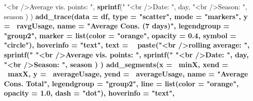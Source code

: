 \documentclass[
  a4paperpaper,
]{book}
\newenvironment{Shaded}{\begin{snugshade}}{\end{snugshade}}
\newcommand{\DataTypeTok}[1]{\textcolor[rgb]{0.13,0.29,0.53}{#1}}
\newcommand{\FloatTok}[1]{\textcolor[rgb]{0.00,0.00,0.81}{#1}}
\newcommand{\KeywordTok}[1]{\textcolor[rgb]{0.13,0.29,0.53}{\textbf{#1}}}
\newcommand{\NormalTok}[1]{#1}
\newcommand{\OperatorTok}[1]{\textcolor[rgb]{0.81,0.36,0.00}{\textbf{#1}}}
\newcommand{\StringTok}[1]{\textcolor[rgb]{0.31,0.60,0.02}{#1}}
\let\oldShaded\Shaded
\let\endoldShaded\endShaded
\renewenvironment{Shaded}{\footnotesize\oldShaded}{\endoldShaded}
\begin{document}
\begin{Shaded}
\begin{Highlighting}[]
{{{{{{{{{{{{{{{{{{{{{{{{{{{{{{{{{{{{{{{                           \StringTok{"<br />Average vis. points: "}\NormalTok{, }\KeywordTok{sprintf}\NormalTok{(}\StringTok{"%
                           \StringTok{"<br />Date:                        "}\NormalTok{, day,}
                           \StringTok{"<br />Season:                   "}\NormalTok{, season}
\NormalTok{            )}
\NormalTok{  ) }\OperatorTok{%
\StringTok{  }\KeywordTok{add_trace}\NormalTok{(}\DataTypeTok{data =}\NormalTok{ df,}
            \DataTypeTok{type =} \StringTok{"scatter"}\NormalTok{,}
            \DataTypeTok{mode =} \StringTok{"markers"}\NormalTok{,}
            \DataTypeTok{y =} \OperatorTok{~}\NormalTok{ravgUsage,}
            \DataTypeTok{name =} \StringTok{"Average Cons. (7 days)"}\NormalTok{,}
            \DataTypeTok{legendgroup =} \StringTok{"group2"}\NormalTok{,}
            \DataTypeTok{marker =} \KeywordTok{list}\NormalTok{(}\DataTypeTok{color =} \StringTok{"orange"}\NormalTok{, }\DataTypeTok{opacity =} \FloatTok{0.4}\NormalTok{, }\DataTypeTok{symbol =} \StringTok{"circle"}\NormalTok{),}
            \DataTypeTok{hoverinfo =} \StringTok{"text"}\NormalTok{,}
            \DataTypeTok{text =} \OperatorTok{~}\StringTok{ }\KeywordTok{paste}\NormalTok{(}\StringTok{"<br />rolling average:        "}\NormalTok{, }\KeywordTok{sprintf}\NormalTok{(}\StringTok{"%
                           \StringTok{"<br />Average vis. points: "}\NormalTok{, }\KeywordTok{sprintf}\NormalTok{(}\StringTok{"%
                           \StringTok{"<br />Date:                        "}\NormalTok{, day,}
                           \StringTok{"<br />Season:                   "}\NormalTok{, season}
\NormalTok{            )}
\NormalTok{  ) }\OperatorTok{%
\StringTok{  }\KeywordTok{add_segments}\NormalTok{(}\DataTypeTok{x =} \OperatorTok{~}\NormalTok{minX,}
               \DataTypeTok{xend =} \OperatorTok{~}\NormalTok{maxX,}
               \DataTypeTok{y =} \OperatorTok{~}\NormalTok{averageUsage,}
               \DataTypeTok{yend =} \OperatorTok{~}\NormalTok{averageUsage,}
               \DataTypeTok{name =} \StringTok{"Average Cons. Total"}\NormalTok{,}
               \DataTypeTok{legendgroup =} \StringTok{"group2"}\NormalTok{,}
               \DataTypeTok{line =} \KeywordTok{list}\NormalTok{(}\DataTypeTok{color =} \StringTok{"orange"}\NormalTok{, }\DataTypeTok{opacity =} \FloatTok{1.0}\NormalTok{, }\DataTypeTok{dash =} \StringTok{"dot"}\NormalTok{),}
               \DataTypeTok{hoverinfo =} \StringTok{"text"}\NormalTok{,}
}}}}}}}}}}}}}}}}}}}}}}}}}}}}}}}}}}}}}}}}}}}}
\end{Highlighting}
\end{Shaded}
\end{document}

